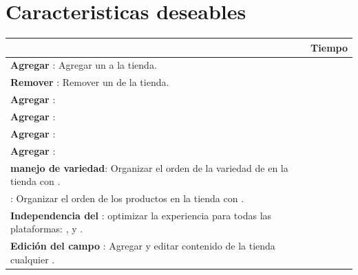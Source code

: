 \section{Caracteristicas deseables}\label{cap:intro:alcance}

\begin{table}[h!]
    \tiny
   
\begin{tabular}{ |L{0.6\paperwidth}|L{0.1\paperwidth}|}
\hline
	\task &
	Tiempo
	
\\ \hline
	\textbf{ Agregar \itemCommerce}: Agregar un \itemCommerce a la tienda.&
	
\\ \hline
	\textbf{ Remover \itemCommerce}: Remover un \itemCommerce de la tienda.&
	
\\ \hline
	\textbf{ Agregar \itemCommerce}: &
	
\\ \hline
	\textbf{ Agregar \itemCommerce}: &
	
\\ \hline
	\textbf{ Agregar \itemCommerce}: &
	
\\ \hline
	\textbf{ Agregar \itemCommerce}: &
	
\\ \hline
	\textbf{ \textit{\dragdrop} manejo de variedad}: Organizar el orden de la variedad de \itemCommerce en la tienda con \textit{\dragdrop}.&
		
\\ \hline
	\textbf{ \dragdrop \merchandising}: Organizar el orden de los productos en la tienda con \textit{\dragdrop}.&
		
\\ \hline
	\textbf{Independencia del \device}: optimizar la experiencia para todas las plataformas: \mobile, \tablet y \desktop \devices.
		
\\ \hline
	 \textbf{Edición del campo \inline}: Agregar y editar contenido de la tienda \clicking cualquier \textfield.&
		

\end{tabular}
\end{table}
